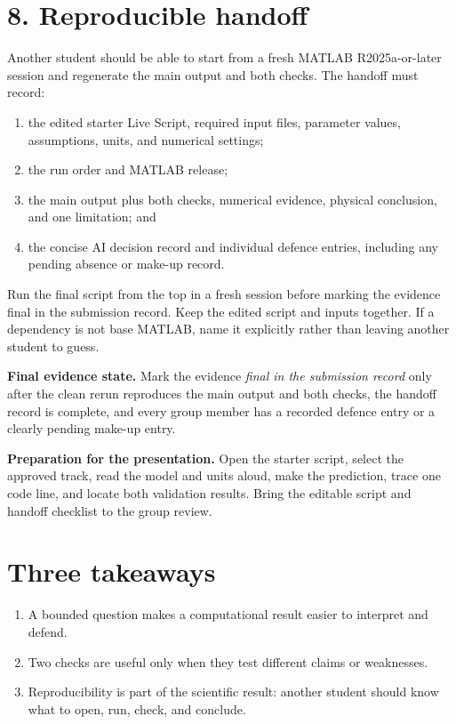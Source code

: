 \documentclass[11pt,a4paper]{article}
\begin{document}
\section*{8. Reproducible handoff}
Another student should be able to start from a fresh MATLAB R2025a-or-later session and regenerate the main output and both checks. The handoff must record:
\begin{enumerate}[nosep,leftmargin=6mm]
\item the edited starter Live Script, required input files, parameter values, assumptions, units, and numerical settings;
\item the run order and MATLAB release;
\item the main output plus both checks, numerical evidence, physical conclusion, and one limitation; and
\item the concise AI decision record and individual defence entries, including any pending absence or make-up record.
\end{enumerate}
Run the final script from the top in a fresh session before marking the evidence final in the submission record. Keep the edited script and inputs together. If a dependency is not base MATLAB, name it explicitly rather than leaving another student to guess.
\begin{keybox}\textbf{Final evidence state.} Mark the evidence \emph{final in the submission record} only after the clean rerun reproduces the main output and both checks, the handoff record is complete, and every group member has a recorded defence entry or a clearly pending make-up entry.\end{keybox}
\begin{keybox}\textbf{Preparation for the presentation.} Open the starter script, select the approved track, read the model and units aloud, make the prediction, trace one code line, and locate both validation results. Bring the editable script and handoff checklist to the group review.\end{keybox}
\section*{Three takeaways}
\begin{enumerate}[nosep,leftmargin=6mm]
\item A bounded question makes a computational result easier to interpret and defend.
\item Two checks are useful only when they test different claims or weaknesses.
\item Reproducibility is part of the scientific result: another student should know what to open, run, check, and conclude.
\end{enumerate}
\end{document}
